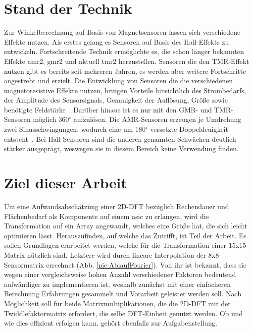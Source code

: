 \section{Stand der Technik}

Zur Winkelberechnung auf Basis von Magnetsensoren lassen sich verschiedene Effekte nutzen. Als erstes gelang es Sensoren auf Basis des Hall-Effekts zu entwickeln. Fortschreitende Technik ermöglichte es, die schon länger bekannten Effekte \gls{amr2}, \gls{gmr2} und aktuell \gls{tmr2} herzustellen. Sensoren die den TMR-Effekt nutzen gibt es bereits seit mehreren Jahren, es werden aber weitere Fortschritte angestrebt und erzielt. 
Die Entwicklung von Sensoren die die verschiedenen magnetoresistive Effekte nutzen, bringen Vorteile hinsichtlich des Strombedarfs, der Amplitude des Sensorsignals, Genauigkeit der Auflösung, Größe sowie benötigte Feldstärke~\autocite[2]{magSensTechOverview}. Darüber hinaus ist es nur mit den GMR- und TMR-Sensoren möglich 360${}^\circ$ aufzulösen. Die AMR-Sensoren erzeugen je Umdrehung zwei Sinusschwingungen, wodurch eine um 180${}^\circ$ versetzte Doppeldeuigkeit entsteht~\autocite{tsukakoshi2017tmrgmr}. Bei Hall-Sensoren sind die anderen genannten Schwächen deutlich stärker ausgeprägt, weswegen sie in diesem Bereich keine Verwendung finden.






\section{Ziel dieser Arbeit}
Um eine Aufwandsabschätzüng einer 2D-DFT bezüglich Rechendauer und Flächenbedarf als Komponente auf einem  \gls{asic} zu erlangen, wird die Transformation auf ein Array angewandt, welches eine Größe 
hat, die sich leicht optimieren lässt. Herauszufinden, auf welche das Zutrifft, ist Teil der Arbeit. 
Es sollen Grundlagen erarbeitet werden, welche für die Transformation einer
15x15-Matrix nützlich sind. Letztere wird durch lineare Interpolation der 8x8-Sensormatrix errechnet (Abb. \ref{pic:AblaufFourier}). Von ihr ist bekannt, dass sie wegen einer vergleichsweise hohen Anzahl verschiedener Faktoren bedeutend
aufwändiger zu implementieren ist, weshalb zunächst mit einer einfacheren Berechnung Erfahrungen gesammelt und Vorarbeit geleistet werden soll.
Nach Möglichkeit soll für beide Matrixmultiplikationen, die die 2D-DFT mit der Twiddlefaktormatrix erfordert, die selbe DFT-Einheit genutzt werden. Ob und wie dies effizient erfolgen kann,
gehört ebenfalls zur Aufgabenstellung.
